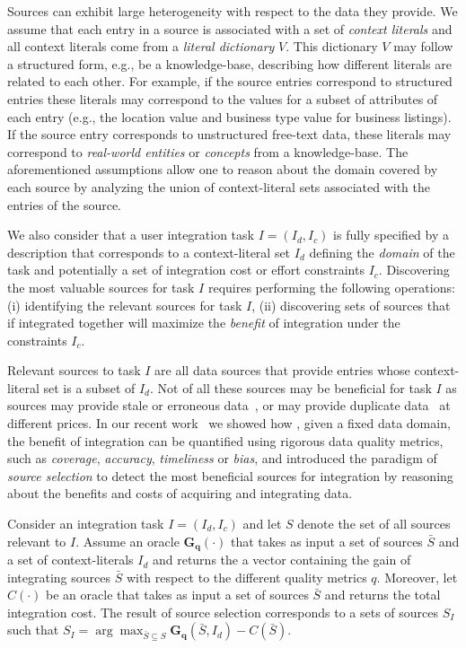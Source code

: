 \documentclass{vldb}
\begin{document}
Sources can exhibit large heterogeneity with respect to the data they provide. We assume that each entry in a source is associated with a set of {\em context literals} and all context literals come from a {\em literal dictionary} $V$. This dictionary $V$ may follow a structured form, e.g., be a knowledge-base, describing how different literals are related to each other. For example, if the source entries correspond to structured entries these literals may correspond to the values for a subset of attributes of each entry (e.g., the location value and business type value for business listings). If the source entry corresponds to unstructured free-text data, these literals may correspond to {\em real-world entities} or {\em concepts} from a knowledge-base. The aforementioned assumptions allow one to reason about the domain covered by each source by analyzing the union of context-literal sets associated with the entries of the source. 

We also consider that a user integration task $I = (I_d, I_c)$ is fully specified by a description that corresponds to a context-literal set $I_d$ defining the {\em domain} of the task and potentially a set of integration cost or effort constraints $I_c$. Discovering the most valuable sources for task $I$ requires performing the following operations: (i) identifying the relevant sources for task $I$, (ii) discovering sets of sources that if integrated together will maximize the {\em benefit} of integration under the constraints $I_c$. 

Relevant sources to task $I$ are all data sources that provide entries whose context-literal set is a subset of $I_d$. Not of all these sources may be beneficial for task $I$ as sources may provide stale or erroneous data~\cite{Dong_vldb:2009, li:2012}, or may provide duplicate data~\cite{bronzi:2013, li:2012} at different prices. In our recent work~\cite{dong:vldb13,rekatsinas:2014, rekatsinas:2015} we showed how
, given a fixed data domain, the benefit of integration can be quantified using rigorous data quality metrics, such as {\em coverage}, {\em accuracy}, {\em timeliness} or {\em bias}, and introduced the paradigm of {\em source selection} to detect the most beneficial sources for integration by reasoning about the benefits and costs of acquiring and integrating data. 

Consider an integration task $I = (I_d, I_c)$ and let $S$ denote the set of all sources relevant to $I$. Assume an oracle $\mathbf{G_q}(\cdot)$ that takes as input a set of sources $\bar{S}$ and a set of context-literals $I_d$ and returns the a vector containing the gain of integrating sources $\bar{S}$ with respect to the different quality metrics $q$. Moreover, let $C(\cdot)$ be an oracle that takes as input a set of sources $\bar{S}$ and returns the total integration cost. The result of source selection corresponds to a sets of sources $S_I$ such that $S_I = \arg\max_{\bar{S} \subseteq S}\mathbf{G_q}(\bar{S},I_d) - C(\bar{S})$.
\end{document}
